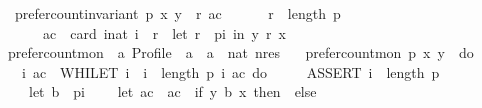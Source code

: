 \begin{isabellebody}
\endisatagproof
{\isafoldproof}%
%
\isadelimproof
\isanewline
%
\endisadelimproof
\isanewline
\isanewline
{}\isamarkupfalse%
\ \ {\isachardoublequoteopen}prefer{\isacharunderscore}{\kern0pt}count{\isacharunderscore}{\kern0pt}invariant\ p\ x\ y\ {\isasymequiv}\ {\isasymlambda}{\isacharparenleft}{\kern0pt}r{\isacharcomma}{\kern0pt}\ ac{\isacharparenright}{\kern0pt}{\isachardot}{\kern0pt}\isanewline
\ \ \ \ \ \ r\ {\isasymle}\ length\ p\ {\isasymand}\isanewline
\ \ \ \ \ \ ac\ {\isacharequal}{\kern0pt}\ card\ {\isacharbraceleft}{\kern0pt}i{\isacharcolon}{\kern0pt}{\isacharcolon}{\kern0pt}nat{\isachardot}{\kern0pt}\ i\ {\isacharless}{\kern0pt}\ r\ {\isasymand}\ {\isacharparenleft}{\kern0pt}let\ r\ {\isacharequal}{\kern0pt}\ {\isacharparenleft}{\kern0pt}p{\isacharbang}{\kern0pt}i{\isacharparenright}{\kern0pt}\ in\ {\isacharparenleft}{\kern0pt}y\ {\isasympreceq}\isactrlsub r\ x{\isacharparenright}{\kern0pt}{\isacharparenright}{\kern0pt}{\isacharbraceright}{\kern0pt}{\isachardoublequoteclose}\isanewline
\isanewline
{}\isamarkupfalse%
\ prefer{\isacharunderscore}{\kern0pt}count{\isacharunderscore}{\kern0pt}mon\ {\isacharcolon}{\kern0pt}{\isacharcolon}{\kern0pt}\ {\isachardoublequoteopen}{\isacharprime}{\kern0pt}a\ Profile\ {\isasymRightarrow}\ {\isacharprime}{\kern0pt}a\ {\isasymRightarrow}\ {\isacharprime}{\kern0pt}a\ {\isasymRightarrow}\ nat\ nres{\isachardoublequoteclose}\ \isanewline
\ \ {\isachardoublequoteopen}prefer{\isacharunderscore}{\kern0pt}count{\isacharunderscore}{\kern0pt}mon\ p\ x\ y\ {\isasymequiv}\ do\ {\isacharbraceleft}{\kern0pt}\isanewline
\ \ \ {\isacharparenleft}{\kern0pt}i{\isacharcomma}{\kern0pt}\ ac{\isacharparenright}{\kern0pt}\ {\isasymleftarrow}\ WHILET\ {\isacharparenleft}{\kern0pt}{\isasymlambda}{\isacharparenleft}{\kern0pt}i{\isacharcomma}{\kern0pt}\ {\isacharunderscore}{\kern0pt}{\isacharparenright}{\kern0pt}{\isachardot}{\kern0pt}\ i\ {\isacharless}{\kern0pt}\ length\ p{\isacharparenright}{\kern0pt}\ {\isacharparenleft}{\kern0pt}{\isasymlambda}{\isacharparenleft}{\kern0pt}i{\isacharcomma}{\kern0pt}\ ac{\isacharparenright}{\kern0pt}{\isachardot}{\kern0pt}\ do\ {\isacharbraceleft}{\kern0pt}\isanewline
\ \ \ \ ASSERT\ {\isacharparenleft}{\kern0pt}i\ {\isacharless}{\kern0pt}\ length\ p{\isacharparenright}{\kern0pt}{\isacharsemicolon}{\kern0pt}\isanewline
\ \ \ \ let\ b\ {\isacharequal}{\kern0pt}\ {\isacharparenleft}{\kern0pt}p{\isacharbang}{\kern0pt}i{\isacharparenright}{\kern0pt}{\isacharsemicolon}{\kern0pt}\isanewline
\ \ \ \ let\ ac\ {\isacharequal}{\kern0pt}\ ac\ {\isacharplus}{\kern0pt}\ {\isacharparenleft}{\kern0pt}if\ y\ {\isasympreceq}\isactrlsub b\ x\ then\ {}\ else\ {}{\isacharparenright}{\kern0pt}{\isacharsemicolon}{\kern0pt}\isanewline

\end{isabellebody}
